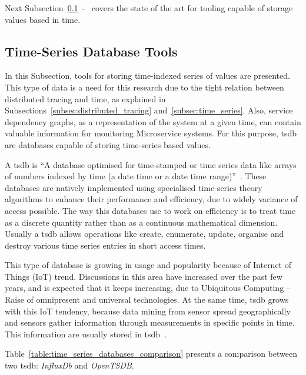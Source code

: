 Next Subsection~\ref{subsec:time_series_database_tools}~-~ covers the state of the art for tooling capable of storage values based in time.

\subsection{Time-Series Database Tools}
\label{subsec:time_series_database_tools}

In this Subsection, tools for storing time-indexed series of values are presented. This type of data is a need for this research due to the tight relation between distributed tracing and time, as explained in Subsections~\ref{subsec:distributed_tracing} and~\ref{subsec:time_series}. Also, service dependency graphs, as a representation of the system at a given time, can contain valuable information for monitoring Microservice systems. For this purpose, \gls{tsdb} are databases capable of storing time-series based values.

A \gls{tsdb} is ``A database optimised for time-stamped or time series data like arrays of numbers indexed by time (a date time or a date time range)''~\cite{Dunning2015}. These databases are natively implemented using specialised time-series theory algorithms to enhance their performance and efficiency, due to widely variance of access possible. The way this databases use to work on efficiency is to treat time as a discrete quantity rather than as a continuous mathematical dimension. Usually a \gls{tsdb} allows operations like create, enumerate, update, organise and destroy various time series entries in short access times.

This type of database is growing in usage and popularity because of Internet of Things (IoT) trend. Discussions in this area have increased over the past few years, and is expected that it keeps increasing, due to Ubiquitous Computing -- Raise of omnipresent and universal technologies. At the same time, \gls{tsdb} grows with this IoT tendency, because data mining from sensor spread geographically and sensors gather information through measurements in specific points in time. This information are usually stored in \gls{tsdb}~\cite{TanayPant2019}.

Table~\ref{table:time_series_databases_comparison} presents a comparison between two \gls{tsdb}: \textit{InfluxDb} and \textit{OpenTSDB}.

